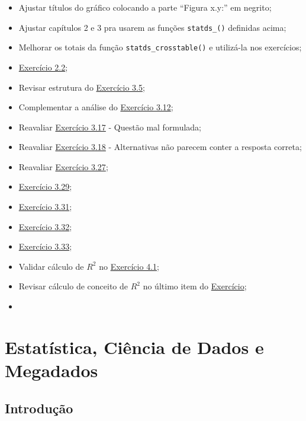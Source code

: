 \documentclass[
]{latex/krantz}
\providecommand{\tightlist}{%
  \setlength{\itemsep}{0pt}\setlength{\parskip}{0pt}}
\theoremstyle{definition}
\theoremstyle{definition}
\theoremstyle{definition}
\theoremstyle{definition}
\theoremstyle{remark}
\begin{document}
\begin{itemize}
\tightlist
\item
  Ajustar títulos do gráfico colocando a parte ``Figura x.y:'' em negrito;
\item
  Ajustar capítulos 2 e 3 pra usarem as funções \texttt{statds\_()} definidas acima;
\item
  Melhorar os totais da função \texttt{statds\_crosstable()} e utilizá-la nos exercícios;
\item
  \protect\hyperlink{exr2-2}{Exercício 2.2};
\item
  Revisar estrutura do \protect\hyperlink{exr3-5}{Exercício 3.5};
\item
  Complementar a análise do \protect\hyperlink{exr3-12}{Exercício 3.12};
\item
  Reavaliar \protect\hyperlink{exr3-17}{Exercício 3.17} - Questão mal formulada;
\item
  Reavaliar \protect\hyperlink{exr3-18}{Exercício 3.18} - Alternativas não parecem conter a resposta correta;
\item
  Reavaliar \protect\hyperlink{exr3-27}{Exercício 3.27};
\item
  \protect\hyperlink{exr3-29}{Exercício 3.29};
\item
  \protect\hyperlink{exr3-31}{Exercício 3.31};
\item
  \protect\hyperlink{exr3-32}{Exercício 3.32};
\item
  \protect\hyperlink{exr3-33}{Exercício 3.33};
\item
  Validar cálculo de \(R^2\) no \protect\hyperlink{exr4-1}{Exercício 4.1};
\item
  Revisar cálculo de conceito de \(R^2\) no último item do \protect\hyperlink{exr4-1}{Exercício};
\item
\end{itemize}

\mainmatter

\hypertarget{estatuxedstica-ciuxeancia-de-dados-e-megadados}{%
\chapter{Estatística, Ciência de Dados e Megadados}\label{estatuxedstica-ciuxeancia-de-dados-e-megadados}}

\hypertarget{introduuxe7uxe3o}{%
\section{Introdução}\label{introduuxe7uxe3o}}
\end{document}
